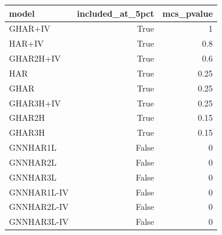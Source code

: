 \begin{tabular}{lrr}
\toprule
model & included_at_5pct & mcs_pvalue \\
\midrule
GHAR+IV & True & 1 \\
HAR+IV & True & 0.8 \\
GHAR2H+IV & True & 0.6 \\
HAR & True & 0.25 \\
GHAR & True & 0.25 \\
GHAR3H+IV & True & 0.25 \\
GHAR2H & True & 0.15 \\
GHAR3H & True & 0.15 \\
GNNHAR1L & False & 0 \\
GNNHAR2L & False & 0 \\
GNNHAR3L & False & 0 \\
GNNHAR1L-IV & False & 0 \\
GNNHAR2L-IV & False & 0 \\
GNNHAR3L-IV & False & 0 \\
\bottomrule
\end{tabular}
